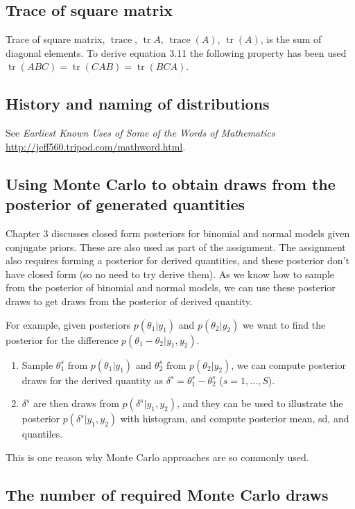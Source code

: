 \documentclass[a4paper,11pt,english]{article}
\DeclareMathOperator{\tr}{tr}
\DeclareMathOperator{\trace}{trace}
\begin{document}
\subsection*{Trace of square matrix}

Trace of square matrix, $\trace$, $\tr A$, $\trace(A)$, $\tr(A)$, is
the sum of diagonal elements. To derive equation 3.11 the following
property has been used $\tr(ABC) = \tr(CAB) = \tr(BCA)$.

\subsection*{History and naming of distributions}

See \emph{Earliest Known Uses of Some of the Words of Mathematics}
\url{http://jeff560.tripod.com/mathword.html}.

\subsection*{Using Monte Carlo to obtain draws from the posterior of generated quantities}

Chapter 3 discusses closed form posteriors for binomial and normal
models given conjugate priors. These are also used as part of the
assignment. The assignment also requires forming a posterior for
derived quantities, and these posterior don't have closed form (so no
need to try derive them). As we know how to sample from the posterior
of binomial and normal models, we can use these posterior draws to get
draws from the posterior of derived quantity.

For example, given posteriors $p(\theta_1|y_1)$ and $p(\theta_2|y_2)$ we want to find the posterior for the difference $p(\theta_1-\theta_2|y_1,y_2)$.
\begin{enumerate}
\item Sample $\theta_1^s$ from $p(\theta_1|y_1)$ and $\theta_2^s$ from
  $p(\theta_2|y_2)$, we can compute posterior draws for the derived
  quantity as $\delta^s=\theta_1^s-\theta_2^s$ ($s=1,\ldots,S$).
\item $\delta^s$ are then draws from $p(\delta^s|y_1,y_2)$, and they
  can be used to illustrate the posterior $p(\delta^s|y_1,y_2)$ with
  histogram, and compute posterior mean, sd, and quantiles.
\end{enumerate}

This is one reason why Monte Carlo approaches are so commonly used.

\subsection*{The number of  required Monte Carlo draws}
\end{document}

